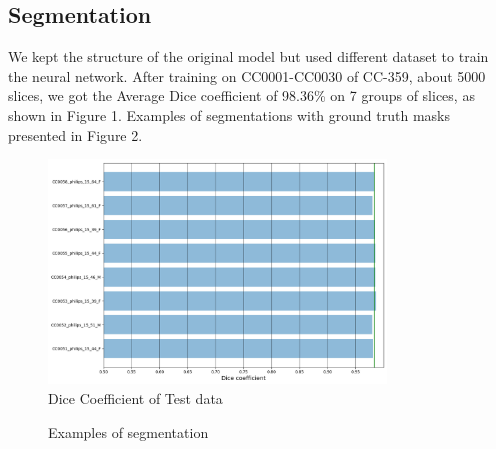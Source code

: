 \documentclass[12pt]{article}
\begin{document}
\subsection{Segmentation}
We kept the structure of the original model but used different dataset to train the neural network. After training on CC0001-CC0030
of CC-359, about 5000 slices, we got the Average Dice coefficient of 98.36\% on 7 groups of slices, as shown in Figure 1. Examples of segmentations with ground truth masks presented in Figure 2.
\begin{figure}[H] 
\centering 
\includegraphics[width=0.8\textwidth]{DSC} 
\caption{Dice Coefficient of Test data} 
\label{DSC} 
\end{figure}

\begin{figure}[H]
\centering 
{}
\caption{Examples of segmentation}
\end{figure}
\end{document}
